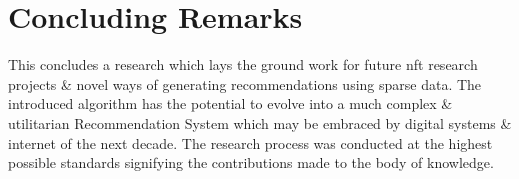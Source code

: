 \section{Concluding Remarks}
This concludes a research which lays the ground work for future \gls{nft} research projects \& novel ways of generating recommendations using sparse data. The introduced algorithm has the potential to evolve into a much complex \& utilitarian Recommendation System which may be embraced by digital systems \& internet of the next decade.
The research process was conducted at the highest possible standards signifying the contributions made to the body of knowledge.